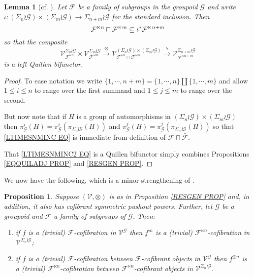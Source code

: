 \documentclass[a4paper,10pt
,draft
]{article}%
\numberwithin{equation}{section}
\numberwithin{figure}{section}
\newtheorem{lemma}[equation]{Lemma}%
\newtheorem{proposition}[equation]{Proposition}%
\theoremstyle{definition} %
\newcommand{\F}{\ensuremath{\mathcal F}}
\newcommand{\V}{\ensuremath{\mathcal V}}
\newcommand{\G}{\ensuremath{\mathcal G}}
\newcommand{\1}{\ensuremath{\mathbbm 1}}%
\begin{document}
\begin{lemma}[cf. {\cite[Prop. 6.22]{BP_geo}}]
\label{LTIMESNMINC LEM}
Let $\F$ be a family of subgroups in the groupoid $\G$ and write
$\iota \colon \left(\Sigma_n \wr \G\right) \times \left(\Sigma_m \wr \G\right) \to \Sigma_{n+m} \wr \G$ for the standard inclusion.
Then 
\begin{equation}\label{LTIMESNMINC EQ}
\F^{\ltimes n} \sqcap \F^{\ltimes m} \subseteq 
\iota^{\**}
\F^{\ltimes n+m}
\end{equation}
so that the composite
\begin{equation}\label{LTIMESNMINC2 EQ}
	\V^{\Sigma_n \wr \G}_{\F^{\ltimes n}} \times \V^{\Sigma_m \wr \G}_{\F^{\ltimes m}}
\xrightarrow{\otimes}
	\V^{\left(\Sigma_n \wr \G\right) \times \left(\Sigma_m \wr \G\right)}_{\F^{\ltimes n} \sqcap \F^{\ltimes m}}
\xrightarrow{\iota_!}
	\V^{\Sigma_{n+m} \wr \G}_{\F^{\ltimes n+m}}
\end{equation}
is a left Quillen bifunctor.
\end{lemma}



\begin{proof}
To ease notation we write
$\{1,\cdots, n+m\} = \{1,\cdots,n\} \amalg \{1,\cdots,m\}$
and allow $1\leq i\leq n$ to range over the first summand and $1 \leq j \leq m$ to range over the second.

But now note that if $H$ is a group of automorphisms in 
$(\Sigma_n \wr \G) \times (\Sigma_m \wr \G)$
then 
$\pi^i_{\G}(H) = \pi^i_{\G}(\pi_{\Sigma_n \wr \G}(H))$
and
$\pi^j_{\G}(H) = \pi^j_{\G}(\pi_{\Sigma_m \wr \G}(H))$
so that 
\eqref{LTIMESNMINC EQ} is immediate from definition of 
$\F \sqcap \bar{\F}$.

That \eqref{LTIMESNMINC2 EQ} is a Quillen bifunctor simply combines 
Propositions \ref{EQQUILADJ PROP} and \ref{RESGEN PROP}.
\end{proof}





We now have the following, which is a minor strengthening of 
\cite[Prop. 6.24]{BP_geo}.




\begin{proposition}\label{SIGMAWRGF PROP}
Suppose $(\V, \otimes)$ is as in Proposition \ref{RESGEN PROP} and,
in addition, it also has cofibrant symmetric pushout powers.
Further, let $\G$ be a groupoid and
$\F$ a family of subgroups of $\G$.
Then:
\begin{enumerate}[label=(\roman*)]
\item if $f$ is a (trivial) $\F$-cofibration in $\V^{\G}$
then $f^{\square n}$ is a (trivial)
$\F^{\ltimes n}$-cofibration in $\V^{\Sigma_n \wr \G}$;
\item if $f$ is a (trivial) $\F$-cofibration between $\F$-cofibrant objects in $\V^{\G}$
then $f^{\otimes n}$ is a (trivial)
$\F^{\ltimes n}$-cofibration
between $\F^{\ltimes n}$-cofibrant objects in $\V^{\Sigma_n \wr \G}$.
\end{enumerate}
\end{proposition}
\end{document}
